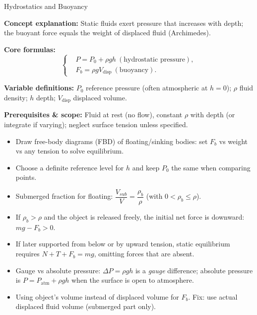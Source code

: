 \label{unit:fluids-thermo}

\begin{KnowledgePoint}{Hydrostatics and Buoyancy \Core}
  \KPFormulas
  \begin{formulabox}
  \textbf{Concept explanation:} Static fluids exert pressure that increases with depth; the buoyant force equals the weight of displaced fluid (Archimedes).

  \textbf{Core formulas:}
  \[
  \left\{\begin{aligned}
    &P=P_0+\rho g h\ (\text{hydrostatic pressure}),\\
    &F_b=\rho g V_{\text{disp}}\ (\text{buoyancy}).
  \end{aligned}\right.
  \]

  \textbf{Variable definitions:} $P_0$ reference pressure (often atmospheric at $h=0$); $\rho$ fluid density; $h$ depth; $V_{\text{disp}}$ displaced volume.

  

  \textbf{Prerequisites \& scope:} Fluid at rest (no flow), constant $\rho$ with depth (or integrate if varying); neglect surface tension unless specified.
  \end{formulabox}

  \KPHeuristics
  \begin{heuristicsbox}
  \begin{itemize}[leftmargin=*]
    \item Draw free-body diagrams (FBD) of floating/sinking bodies: set $F_b$ vs weight vs any tension to solve equilibrium.
    \item Choose a definite reference level for $h$ and keep $P_0$ the same when comparing points.
    \item Submerged fraction for floating: $\dfrac{V_{sub}}{V}=\dfrac{\rho_b}{\rho}$ (with $0<\rho_b\le\rho$).
    \item If $\rho_b>\rho$ and the object is released freely, the initial net force is downward: $mg-F_b>0$.
    \item If later supported from below or by upward tension, static equilibrium requires $N+T+F_b=mg$, omitting forces that are absent.
    \item Gauge vs absolute pressure: $\Delta P=\rho g h$ is a \emph{gauge} difference; absolute pressure is $P= P_{\text{atm}}+\rho g h$ when the surface is open to atmosphere.
  \end{itemize}
  \vspace{0.4em}
  \begin{itemize}[leftmargin=*]
    \item Using object's volume instead of displaced volume for $F_b$. Fix: use actual displaced fluid volume (submerged part only).
  \end{itemize}
  \end{heuristicsbox}


\end{KnowledgePoint}
